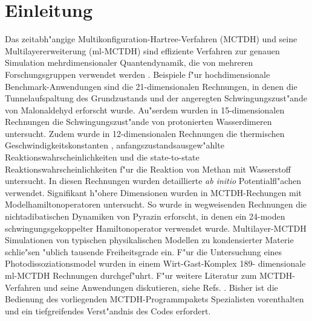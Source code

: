 \chapter{Einleitung}
\label{ch:einleitung}

Das zeitabh"angige Multikonfiguration-Hartree-Verfahren (MCTDH) 
\cite{MMC, MMC1} und seine Multilayererweiterung (ml-MCTDH)
\cite{WT3, Mreview2} 
sind effiziente Verfahren zur genauen Simulation mehrdimensionaler Quantendynamik,
die von mehreren Forschungsgruppen verwendet werden 
\cite{MCTDHex1, WestPNM, MCTDHex2, W1, MCTDHex4, MCTDHex5, MCTDHex6, MCTDHex7, MCTDHex8,
MCTDHex9, MCTDHex10, MCTDHex11, MCTDHex12, MCTDHex13, MCTDHex14, MCTDHex15, MCTDHex16, MCTDHex17,MCTDHex18}. 
Beispiele f"ur hochdimensionale 
Benchmark-Anwendungen sind die 21-dimen\-sio\-nalen Rechnungen, in denen die Tunnelaufspaltung des
Grundzustands \cite{CVM, HCVM, HaM1, MAMCTDH, HaM2, MAMCTDH2} und der angeregten \cite{HCVM, HaM1, MAMCTDH, HaM2, MAMCTDH2}
Schwingungszust"ande von Malonaldehyd erforscht wurde. 
Au"serdem wurden in 15-dimen\-sio\-nalen Rechnungen die Schwingungszust"ande von protonierten 
Wasserdimeren \cite{H5O2+MCTDH, H5O2+MCTDH2, H5O2+MCTDH3, H5O2+MCTDH4, H5O2+MCTDH5} untersucht. 
Zudem wurde in 12-dimensionalen Rechnungen die thermischen 
Geschwindig\-keitskonstanten \cite{HM1, HM2, WWM, SM, vHNM,NvHM}, anfangszustandsausgew"ahlte Reaktionswahrscheinlichkeiten
\cite{SM02, SM04, WeM5, WeM6, WeM8} und die 
state-to-state Reaktionswahrscheinlichkeiten \cite{WeM7} f"ur die Reaktion von Methan mit Wasserstoff 
untersucht. In diesen Rechnungen wurden detaillierte \textit{ab initio} 
Potentialfl"achen verwendet. Signifikant h"ohere Dimensionen wurden in MCTDH-Rechungen mit 
Modelhamiltonoperatoren untersucht. So wurde in wegweisenden Rechnungen  
die nichtadibatischen Dynamiken von Pyrazin erforscht, in denen ein 24-moden 
schwingungsgekoppelter Hamiltonoperator \cite{WMC, WMC2, RWMC} verwendet wurde.
Multilayer-MCTDH Simulationen von typischen
physikalischen Modellen \cite{WT3, W1, WST, KCBWT, CTW2, WPHT} zu kondensierter Materie schlie"sen "ublich tausende Freiheitsgrade ein.
F"ur die Untersuchung eines Photodissoziationsmodel wurden in einem Wirt-Gast-Komplex 189-
dimensionale ml-MCTDH Rechnungen  durchgef"uhrt\cite{WBRSM}. F"ur weitere Literatur zum MCTDH-Verfahren und
seine Anwendungen diskutieren, siehe Refs. \cite{MCTDHreview, MCTDHreview2, HMreview1, MCTDHbook,Mreview2011, MCTDHreview3}.
Bisher ist die Bedienung des vorliegenden MCTDH-Programmpakets Spezialisten vorenthalten und 
ein tiefgreifendes Verst"andnis des Codes erfordert. 


